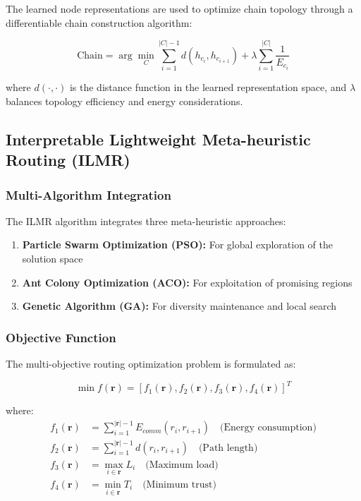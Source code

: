 \documentclass[conference]{IEEEtran}
\begin{document}
The learned node representations are used to optimize chain topology through a differentiable chain construction algorithm:

\begin{equation}
\text{Chain} = \arg\min_{C} \sum_{i=1}^{|C|-1} d(h_{c_i}, h_{c_{i+1}}) + \lambda \sum_{i=1}^{|C|} \frac{1}{E_{c_i}}
\end{equation}

where $d(\cdot, \cdot)$ is the distance function in the learned representation space, and $\lambda$ balances topology efficiency and energy considerations.

\subsection{Interpretable Lightweight Meta-heuristic Routing (ILMR)}

\subsubsection{Multi-Algorithm Integration}

The ILMR algorithm integrates three meta-heuristic approaches:

\begin{enumerate}
    \item \textbf{Particle Swarm Optimization (PSO):} For global exploration of the solution space
    \item \textbf{Ant Colony Optimization (ACO):} For exploitation of promising regions
    \item \textbf{Genetic Algorithm (GA):} For diversity maintenance and local search
\end{enumerate}

\subsubsection{Objective Function}

The multi-objective routing optimization problem is formulated as:

\begin{equation}
\min f(\mathbf{r}) = [f_1(\mathbf{r}), f_2(\mathbf{r}), f_3(\mathbf{r}), f_4(\mathbf{r})]^T
\end{equation}

where:
\begin{align}
f_1(\mathbf{r}) &= \sum_{i=1}^{|\mathbf{r}|-1} E_{comm}(r_i, r_{i+1}) \quad \text{(Energy consumption)} \\
f_2(\mathbf{r}) &= \sum_{i=1}^{|\mathbf{r}|-1} d(r_i, r_{i+1}) \quad \text{(Path length)} \\
f_3(\mathbf{r}) &= \max_{i \in \mathbf{r}} L_i \quad \text{(Maximum load)} \\
f_4(\mathbf{r}) &= \min_{i \in \mathbf{r}} T_i \quad \text{(Minimum trust)}
\end{align}
\end{document}
